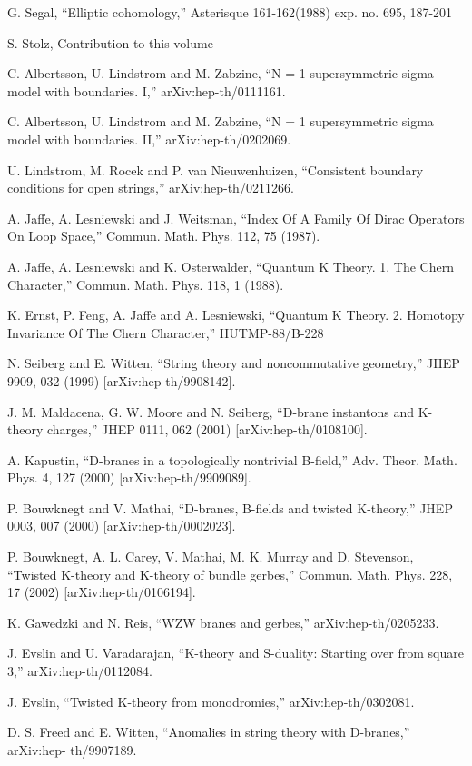 \documentclass[11pt,a4paper]{ctexart}
\begin{document}
\begin{enumerate}[label={[\arabic*]},leftmargin=*,itemsep=2pt]
\item G. Segal, “Elliptic cohomology,” Asterisque 161-162(1988) exp. no. 695, 187-201
\item S. Stolz, Contribution to this volume
\item C. Albertsson, U. Lindstrom and M. Zabzine, “N = 1 supersymmetric sigma model with boundaries. I,” arXiv:hep-th/0111161.
\item C. Albertsson, U. Lindstrom and M. Zabzine, “N = 1 supersymmetric sigma model with boundaries. II,” arXiv:hep-th/0202069.
\item U. Lindstrom, M. Rocek and P. van Nieuwenhuizen, “Consistent boundary conditions for open strings,” arXiv:hep-th/0211266.
\item A. Jaffe, A. Lesniewski and J. Weitsman, “Index Of A Family Of Dirac Operators On Loop Space,” Commun. Math. Phys. 112, 75 (1987).
\item A. Jaffe, A. Lesniewski and K. Osterwalder, “Quantum K Theory. 1. The Chern Character,” Commun. Math. Phys. 118, 1 (1988).
\item K. Ernst, P. Feng, A. Jaffe and A. Lesniewski, “Quantum K Theory. 2. Homotopy Invariance Of The Chern Character,” HUTMP-88/B-228
\item N. Seiberg and E. Witten, “String theory and noncommutative geometry,” JHEP 9909, 032 (1999) [arXiv:hep-th/9908142].
\item J. M. Maldacena, G. W. Moore and N. Seiberg, “D-brane instantons and K-theory charges,” JHEP 0111, 062 (2001) [arXiv:hep-th/0108100].
\item A. Kapustin, “D-branes in a topologically nontrivial B-field,” Adv. Theor. Math. Phys. 4, 127 (2000) [arXiv:hep-th/9909089].
\item P. Bouwknegt and V. Mathai, “D-branes, B-fields and twisted K-theory,” JHEP 0003, 007 (2000) [arXiv:hep-th/0002023].
\item P. Bouwknegt, A. L. Carey, V. Mathai, M. K. Murray and D. Stevenson, “Twisted K-theory and K-theory of bundle gerbes,” Commun. Math. Phys. 228, 17 (2002) [arXiv:hep-th/0106194].
\item K. Gawedzki and N. Reis, “WZW branes and gerbes,” arXiv:hep-th/0205233.
\item J. Evslin and U. Varadarajan, “K-theory and S-duality: Starting over from square 3,” arXiv:hep-th/0112084.
\item J. Evslin, “Twisted K-theory from monodromies,” arXiv:hep-th/0302081.
\item D. S. Freed and E. Witten, “Anomalies in string theory with D-branes,” arXiv:hep- th/9907189.

\end{enumerate}
\end{document}
